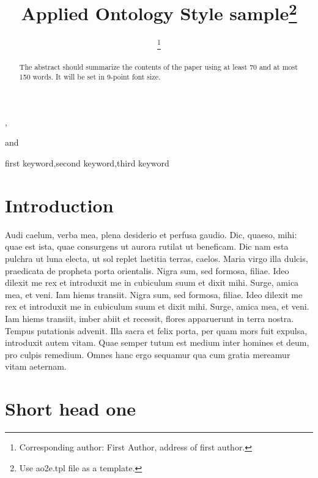 \documentclass{ao2e}%
\begin{document}
\begin{frontmatter}                           %
%
\title{Applied Ontology Style sample\thanks{Use ao2e.tpl file as a template.}}

\author[A]{ %
\thanks{Corresponding author: First Author, address of first author.}},
\author[A]{ }
and
\author[B]{ }
\address[A]{Address of the First and Second authors, usually few lines long\\
E-mail: \{first,second\}@somewhere.com}
\address[B]{Address of the Third author, usually few lines long\\
E-mail: third@somewhere.com}

\begin{abstract}
The abstract should summarize the contents of the paper
using at least 70 and at most 150 words. It will be set in
9-point font size.
\end{abstract}

\begin{keyword}
first keyword\sep second keyword\sep third keyword
\end{keyword}

\end{frontmatter}

\section{Introduction}
Audi caelum, verba mea, plena desiderio et perfusa gaudio. Dic,
quaeso, mihi: quae est ista, quae consurgens ut aurora rutilat ut
beneficam. Dic nam esta pulchra ut luna electa, ut sol replet
laetitia terras, caelos. Maria virgo illa dulcis, praedicata de
propheta porta orientalis. Nigra sum, sed formosa, filiae. Ideo
dilexit me rex et introduxit me in cubiculum suum et dixit mihi.
Surge, amica mea, et veni. Iam hiems transiit. Nigra sum, sed
formosa, filiae. Ideo dilexit me rex et introduxit me in cubiculum
suum et dixit mihi. Surge, amica mea, et veni.  Iam hiems transiit,
imber abiit et recessit, flores apparuerunt in terra nostra.  Tempus
putationis advenit. Illa sacra et felix porta, per quam mors fuit
expulsa, introduxit autem vitam. Quae semper tutum est medium inter
homines et deum, pro culpis remedium. Omnes hanc ergo sequamur qua
cum gratia mereamur vitam aeternam.

\section{Short head one}
\end{document}
